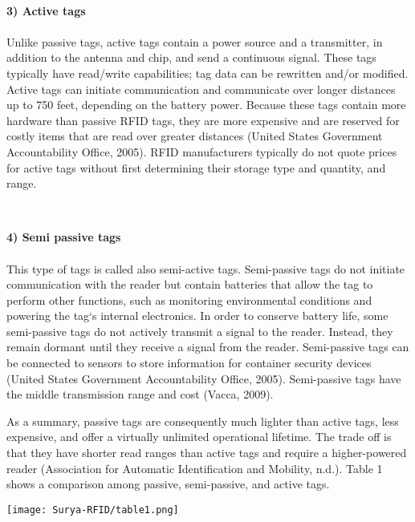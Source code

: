 \documentclass[a4paper,12pt]{article}
\begin{document}
\begin{multicols}{2}
\\
\item \textbf  {3)	Active tags}\\
\\
Unlike passive tags, active tags contain a power source and a transmitter, in addition to the antenna and chip, and send a continuous signal. These tags typically have read/write capabilities; tag data can be rewritten and/or modified. Active tags can initiate communication and communicate over longer distances up to 750 feet, depending on the battery power. Because these tags contain more hardware than passive RFID tags, they are more expensive and are reserved for costly items that are read over greater distances (United States Government Accountability Office, 2005). RFID manufacturers typically do not quote prices for active tags without first determining their storage type and quantity, and range.


\\
\item \textbf{4)	Semi passive tags}\\
\\
This type of tags is called also semi-active tags. Semi-passive tags do not initiate communication with the reader but contain batteries that allow the tag to perform other functions, such as monitoring environmental conditions and powering the tag‘s internal electronics. In order to conserve battery life, some semi-passive tags do not actively transmit a signal to the reader. Instead, they remain dormant until they receive a signal from the reader. Semi-passive tags can be connected to sensors to store information for container security devices (United States Government Accountability Office, 2005). Semi-passive tags have the middle transmission range and cost (Vacca, 2009).

As a summary, passive tags are consequently much lighter than active tags, less expensive, and offer a virtually unlimited operational lifetime. The trade off is that they have shorter read ranges than active tags and require a higher-powered reader (Association for Automatic Identification and Mobility, n.d.). Table 1 shows a comparison among passive, semi-passive, and active tags.

\texttt{[image: Surya-RFID/table1.png]}


\end{multicols}
\end{document}

